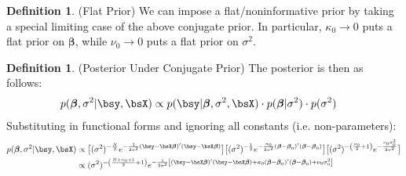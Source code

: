 \documentclass[12pt]{article}
\theoremstyle{plain}
\theoremstyle{definition}
\newtheorem{defn}[thm]{Definition}
\theoremstyle{remark}
\newcommand{\ra}{\rightarrow}
\newcommand{\bsbeta}{\boldsymbol{\beta}}
\begin{document}
\begin{defn}(Flat Prior)
We can impose a flat/noninformative prior by taking a special limiting
case of the above conjugate prior.
In particular, $\kappa_0\ra0$ puts a flat prior on $\bsbeta$, while
$\nu_0\ra 0$ puts a flat prior on $\sigma^2$.
\end{defn}

\begin{defn}(Posterior Under Conjugate Prior)
\label{defn:posteriornormal}
The posterior is then as follows:
\begin{align*}
   p(\bsbeta, \sigma^2 | \bsy,\bsX)
   &\propto
   p(\bsy|\bsbeta,\sigma^2,\bsX)\cdot p(\bsbeta|\sigma^2)\cdot p(\sigma^2)
\end{align*}
Substituting in functional forms and ignoring all constants (i.e.
non-parameters):
\begin{align*}
  p(\bsbeta, \sigma^2 | \bsy,\bsX)
  &\propto
  \big[
  (\sigma^2)^{-\frac{N}{2}}
  e^{-\frac{1}{2\sigma^2}(\bsy-\bsX\bsbeta)'(\bsy-\bsX\bsbeta)}
  \big]
  \big[
  (\sigma^2)^{-\frac{1}{2}}
  e^{-\frac{\kappa_0}{2\sigma^2}(\bsbeta-\bsbeta_0)'(\bsbeta-\bsbeta_0)}
  \big]
  \big[
    (\sigma^2)^{-\left(\frac{\nu_0}{2}+1\right)}
    e^{-\frac{\nu_0\sigma_0^2}{2\sigma^2}}
  \big]
  \\
  &\propto
  (\sigma^2)^{-\left(\frac{N+\nu_0+1}{2}+1\right)}
  e^{%
    -\frac{1}{2\sigma^2}
    \left[
    (\bsy-\bsX\bsbeta)'(\bsy-\bsX\bsbeta)
    + \kappa_0(\bsbeta-\bsbeta_0)'(\bsbeta-\bsbeta_0)
    +\nu_0\sigma^2_0
    \right]
  }
\end{align*}
\end{defn}



\clearpage
\end{document}
